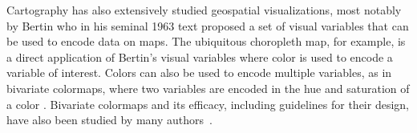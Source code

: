 Cartography has also extensively studied geospatial visualizations, most notably by Bertin \cite{bertin1983semiology} who in his seminal 1963 text proposed a set of visual variables that can be used to encode data on maps. 
%
The ubiquitous choropleth map, for example, is a direct application of Bertin's visual variables where color is used to encode a variable of interest.
%
Colors can also be used to encode multiple variables, as in bivariate colormaps, where two variables are encoded in the hue and saturation of a color \cite{Tyner_2014}.
%
Bivariate colormaps and its efficacy, including guidelines for their design, have also been studied by many authors~\cite{eyton1984complementary, olson1981spectrally, wainer_empirical_1980, strode2020bivariate, schloss_mapping_2019}. 



